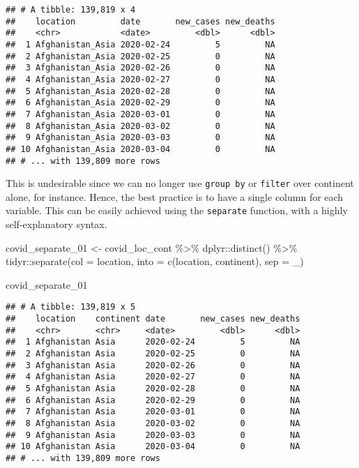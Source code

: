 \documentclass[
]{book}
\newenvironment{Shaded}{\begin{snugshade}}{\end{snugshade}}
\newcommand{\AttributeTok}[1]{\textcolor[rgb]{0.77,0.63,0.00}{#1}}
\newcommand{\FunctionTok}[1]{\textcolor[rgb]{0.00,0.00,0.00}{#1}}
\newcommand{\NormalTok}[1]{#1}
\newcommand{\OtherTok}[1]{\textcolor[rgb]{0.56,0.35,0.01}{#1}}
\newcommand{\SpecialCharTok}[1]{\textcolor[rgb]{0.00,0.00,0.00}{#1}}
\newcommand{\StringTok}[1]{\textcolor[rgb]{0.31,0.60,0.02}{#1}}
\begin{document}
\begin{verbatim}
## # A tibble: 139,819 x 4
##    location         date       new_cases new_deaths
##    <chr>            <date>         <dbl>      <dbl>
##  1 Afghanistan_Asia 2020-02-24         5         NA
##  2 Afghanistan_Asia 2020-02-25         0         NA
##  3 Afghanistan_Asia 2020-02-26         0         NA
##  4 Afghanistan_Asia 2020-02-27         0         NA
##  5 Afghanistan_Asia 2020-02-28         0         NA
##  6 Afghanistan_Asia 2020-02-29         0         NA
##  7 Afghanistan_Asia 2020-03-01         0         NA
##  8 Afghanistan_Asia 2020-03-02         0         NA
##  9 Afghanistan_Asia 2020-03-03         0         NA
## 10 Afghanistan_Asia 2020-03-04         0         NA
## # ... with 139,809 more rows
\end{verbatim}

This is undesirable since we can no longer use \texttt{group\ by} or \texttt{filter} over continent alone, for instance. Hence, the best practice is to have a single column for each variable. This can be easily achieved using the \texttt{separate} function, with a highly self-explanatory syntax.

\begin{Shaded}
\begin{Highlighting}[]
\NormalTok{covid\_separate\_01 }\OtherTok{\textless{}{-}}\NormalTok{ covid\_loc\_cont }\SpecialCharTok{\%\textgreater{}\%} 
\NormalTok{  dplyr}\SpecialCharTok{::}\FunctionTok{distinct}\NormalTok{() }\SpecialCharTok{\%\textgreater{}\%} 
\NormalTok{  tidyr}\SpecialCharTok{::}\FunctionTok{separate}\NormalTok{(}\AttributeTok{col  =} \StringTok{\textquotesingle{}location\textquotesingle{}}\NormalTok{,}
                  \AttributeTok{into =} \FunctionTok{c}\NormalTok{(}\StringTok{\textquotesingle{}location\textquotesingle{}}\NormalTok{, }\StringTok{\textquotesingle{}continent\textquotesingle{}}\NormalTok{),}
                  \AttributeTok{sep  =} \StringTok{\textquotesingle{}\_\textquotesingle{}}\NormalTok{)}

\NormalTok{covid\_separate\_01}
\end{Highlighting}
\end{Shaded}

\begin{verbatim}
## # A tibble: 139,819 x 5
##    location    continent date       new_cases new_deaths
##    <chr>       <chr>     <date>         <dbl>      <dbl>
##  1 Afghanistan Asia      2020-02-24         5         NA
##  2 Afghanistan Asia      2020-02-25         0         NA
##  3 Afghanistan Asia      2020-02-26         0         NA
##  4 Afghanistan Asia      2020-02-27         0         NA
##  5 Afghanistan Asia      2020-02-28         0         NA
##  6 Afghanistan Asia      2020-02-29         0         NA
##  7 Afghanistan Asia      2020-03-01         0         NA
##  8 Afghanistan Asia      2020-03-02         0         NA
##  9 Afghanistan Asia      2020-03-03         0         NA
## 10 Afghanistan Asia      2020-03-04         0         NA
## # ... with 139,809 more rows
\end{verbatim}
\end{document}
